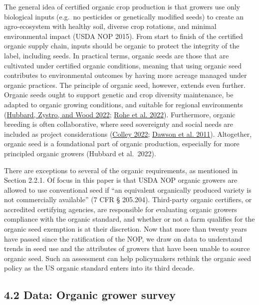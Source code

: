 \documentclass[twoside,12pt,final]{ucthesis-CA2012}
\begin{document}
\begin{ucmainmatter}
The general idea of certified organic crop production is that growers
use only biological inputs (e.g.~no pesticides or genetically modified
seeds) to create an agro-ecosystem with healthy soil, diverse crop
rotations, and minimal environmental impact (USDA NOP 2015). From start
to finish of the certified organic supply chain, inputs should be
organic to \textquotesingle protect the integrity\textquotesingle{} of the label, including seeds. In
practical terms, organic seeds are those that are cultivated under
certified organic conditions, meaning that using organic seed
contributes to environmental outcomes by having more acreage managed
under organic practices. The principle of organic seed, however, extends
even further. Organic seeds ought to support genetic and crop diversity
maintenance, be adapted to organic growing conditions, and suitable for
regional environments
(\protect\hyperlink{ref-Hubbard_Zystro_Wood_2022}{Hubbard, Zystro, and Wood 2022}; \protect\hyperlink{ref-Rohe_Oltmer_Wolter_Gmeiner_Tschersich_2022}{Rohe et al. 2022}).
Furthermore, organic breeding is often collaborative, where seed
sovereignty and social needs are included as project considerations
(\protect\hyperlink{ref-Colley_2022}{Colley 2022}; \protect\hyperlink{ref-Dawson_Riviuxe8re_Berthellot_Mercier_Kochko_Galic_Pin_Serpolay_Thomas_Giuliano_et_al._2011}{Dawson et al. 2011}). Altogether,
organic seed is a foundational part of organic production, especially
for more principled organic growers (Hubbard et al.~2022).

There are exceptions to several of the organic requirements, as
mentioned in Section 2.2.1. Of focus in this paper is that USDA NOP
organic growers are allowed to use conventional seed if ``an equivalent
organically produced variety is not commercially available'' (7 CFR §
205.204). Third-party organic certifiers, or accredited certifying
agencies, are responsible for evaluating organic growers\textquotesingle{} compliance
with the organic standard, and whether or not a farm qualifies for the
organic seed exemption is at their discretion. Now that more than twenty
years have passed since the ratification of the NOP, we draw on data to
understand trends in seed use and the attributes of growers that have
been unable to source organic seed. Such an assessment can help
policymakers rethink the organic seed policy as the US organic standard
enters into its third decade.

\hypertarget{data-organic-grower-survey}{%
\subsection{4.2 Data: Organic grower survey}\label{data-organic-grower-survey}}


\end{ucmainmatter}
\end{document}
